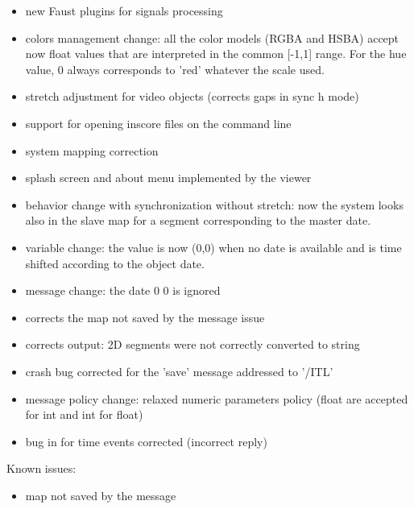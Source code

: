 \begin{itemize}
\item new Faust plugins for signals processing
\item colors management change: all the color models (RGBA and HSBA) accept now
  float values that are interpreted in the common [-1,1] range. For the
  hue value, 0 always corresponds to 'red' whatever the scale used.
\item stretch adjustment for video objects (corrects gaps in sync h mode)
\item support for opening inscore files on the command line
\item system mapping correction
\item splash screen and about menu implemented by the viewer
\end{itemize}

\begin{itemize}
\item behavior change with synchronization without stretch: now the system looks also in the
  slave map for a segment corresponding to the master date.
\item {} variable change: the value is now (0,0) when no date is available and  is time shifted according to the object date.
\item {} message change: the date 0 0 is ignored
\end{itemize}


\begin{itemize}
\item corrects the map not saved by the  message issue
\item corrects  output: 2D segments were not correctly converted to string
\end{itemize}

\begin{itemize}
\item crash bug corrected for the 'save' message addressed to '/ITL'
\item message policy change: relaxed numeric parameters policy (float are accepted for int and int for float)
\item bug in  for time events corrected (incorrect reply)
\end{itemize}
Known issues:
\begin{itemize}
\item map not saved by the  message 
\end{itemize}

